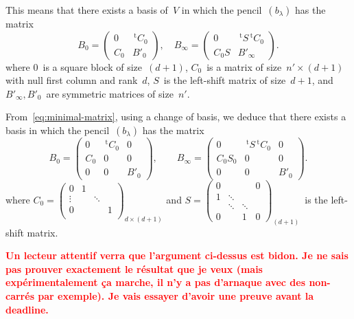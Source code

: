 \documentclass{lms}%
\def\transpose{\,{}^{\mathrm{t}\!}}
\def\mat#1{\begin{pmatrix}#1\end{pmatrix}}
\def\commentaire#1{{\bfseries\textcolor{red}{#1}}}
\begin{document}
This means that there exists a basis of~$V$ in which the pencil~$(b_{λ})$
has the matrix
\begin{equation}\label{eq:minimal-matrix}
B_{0} = \mat{0 & \transpose{C_0}\\ C_0 & B'_{0}}, \quad
B_{∞} = \mat{0 & \transpose{S} \transpose{C_0}\\ C_0S & B'_{∞}}.
\end{equation}
where $0$~is a square block of size~$(d+1)$, $C_0$~is a matrix of size~$n'
× (d+1)$ with null first column and rank~$d$, $S$~is the left-shift
matrix of size~$d+1$, and $B'_{∞}, B'_0$~are symmetric matrices of
size~$n'$.


From~\eqref{eq:minimal-matrix}, using a change of basis, we deduce
that there exists a basis in which the pencil~$(b_{λ})$ has the matrix
\begin{equation}
B_0 = \mat{0 & \transpose{C_0} & 0 \\ C_0 & 0 & 0 \\ 0 & 0 & B'_0},\qquad
B_{∞} = \mat{0 & \transpose{S} \transpose{C_0} & 0 \\
  C_0 S_0 & 0 & 0 \\ 0 & 0 & B'_0}.
\end{equation}
where $C_0 = \mat{0 & 1 & & \\⋮& &⋱&\\0&&&1\\}_{d×(d+1)}$ and $S =
\mat{0&&&0\\ 1&⋱&&\\&⋱&⋱&\\0&&1&0}_{(d+1)}$~is the left-shift matrix.

\commentaire{Un lecteur attentif verra que l'argument ci-dessus est
bidon. Je ne sais pas prouver exactement le résultat que je veux (mais
expérimentalement ça marche, il n'y a pas d'arnaque avec des non-carrés
par exemple). Je vais essayer d'avoir une preuve avant la deadline.}
\end{document}
